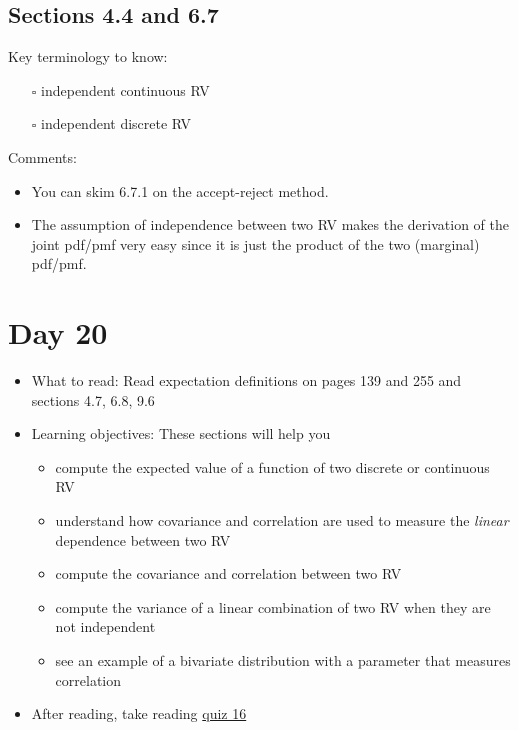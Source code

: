 \documentclass[
  letterpaper,
]{scrbook}
\providecommand{\tightlist}{%
  \setlength{\itemsep}{0pt}\setlength{\parskip}{0pt}}\usepackage{longtable,booktabs,array}
\begin{document}
\subsection*{Sections 4.4 and 6.7}\label{sections-4.4-and-6.7}

Key terminology to know:

\begin{itemize}
\tightlist
\item[$\square$]
  independent continuous RV
\item[$\square$]
  independent discrete RV
\end{itemize}

Comments:

\begin{itemize}
\tightlist
\item
  You can skim 6.7.1 on the accept-reject method.
\item
  The assumption of independence between two RV makes the derivation of
  the joint pdf/pmf very easy since it is just the product of the two
  (marginal) pdf/pmf.
\end{itemize}

\section*{Day 20}\label{day-20}


\begin{itemize}
\item
  What to read: Read expectation definitions on pages 139 and 255 and
  sections 4.7, 6.8, 9.6
\item
  Learning objectives: These sections will help you

  \begin{itemize}
  \tightlist
  \item
    compute the expected value of a function of two discrete or
    continuous RV
  \item
    understand how covariance and correlation are used to measure the
    \emph{linear} dependence between two RV
  \item
    compute the covariance and correlation between two RV
  \item
    compute the variance of a linear combination of two RV when they are
    not independent
  \item
    see an example of a bivariate distribution with a parameter that
    measures correlation
  \end{itemize}
\item
  After reading, take reading
  \href{https://forms.gle/b5vx8Ezd2b5SB2Jz9}{quiz 16}
\end{itemize}
\end{document}
